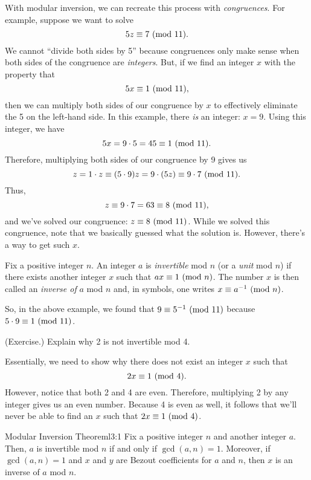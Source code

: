 \documentclass[letterpaper]{article}
\begin{document}
\bigskip 

With modular inversion, we can recreate this process with \emph{congruences}. For example, suppose we want to solve 
\[5z \equiv 7 \ (\mathrm{mod}\ 11).\]
We cannot ``divide both sides by 5'' because congruences only make sense when both sides of the congruence are \emph{integers}. But, if we find an integer $x$ with the property that 
\[5x \equiv 1 \ (\mathrm{mod}\ 11),\] 
then we can multiply both sides of our congruence by $x$ to effectively eliminate the 5 on the left-hand side. In this example, there \emph{is} an integer: $x = 9$. Using this integer, we have 
\[5x = 9 \cdot 5 = 45 \equiv 1 \ (\mathrm{mod}\ 11).\]
Therefore, multiplying both sides of our congruence by 9 gives us 
\[z = 1 \cdot z \equiv (5 \cdot 9)z = 9 \cdot (5z) \equiv 9 \cdot 7 \ (\mathrm{mod}\ 11).\]
Thus, 
\[z \equiv 9 \cdot 7 = 63 \equiv 8 \ (\mathrm{mod}\ 11),\]
and we've solved our congruence: $z \equiv 8 \ (\mathrm{mod}\ 11)$. While we solved this congruence, note that we basically guessed what the solution is. However, there's a way to get such $x$.

\begin{definition}{}{}
    Fix a positive integer $n$. An integer $a$ is \emph{invertible} mod $n$ (or a \emph{unit} mod $n$) if there exists another integer $x$ such that $ax \equiv 1 \ (\mathrm{mod}\ n)$. The number $x$ is then called an \emph{inverse of} $a$ mod $n$ and, in symbols, one writes $x \equiv a^{-1} \ (\mathrm{mod}\ n)$. 
\end{definition}
So, in the above example, we found that $9 \equiv 5^{-1} \ (\mathrm{mod}\ 11)$ because $5 \cdot 9 \equiv 1 \ (\mathrm{mod}\ 11)$. 

\begin{mdframed}
    (Exercise.) Explain why 2 is not invertible mod 4.
    \begin{mdframed}
        Essentially, we need to show why there does not exist an integer $x$ such that 
        \[2x \equiv 1 \ (\mathrm{mod}\ 4).\]
        However, notice that both 2 and 4 are even. Therefore, multiplying 2 by any integer gives us an even number. Because 4 is even as well, it follows that we'll never be able to find an $x$ such that $2x \equiv 1 \ (\mathrm{mod}\ 4)$. 
    \end{mdframed}
\end{mdframed}

\begin{theorem}{Modular Inversion Theorem}{l3:1}
    Fix a positive integer $n$ and another integer $a$. Then, $a$ is invertible mod $n$ if and only if $\gcd(a, n) = 1$. Moreover, if $\gcd(a, n) = 1$ and $x$ and $y$ are Bezout coefficients for $a$ and $n$, then $x$ is an inverse of $a$ mod $n$. 
\end{theorem}
\end{document}
